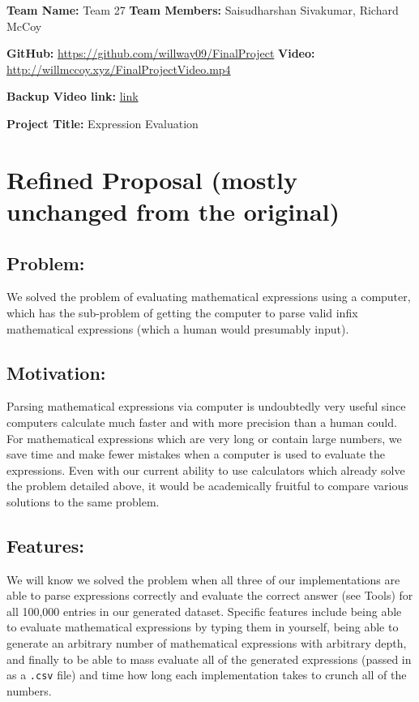 \documentclass[11pt]{article}
\begin{document}
\textbf{Team Name:} Team 27 \hspace*{1cm} \textbf{Team Members:} Saisudharshan Sivakumar, Richard McCoy

\textbf{GitHub:} \href{https://github.com/willway09/FinalProject}{https://github.com/willway09/FinalProject} \textbf{Video:} \href{http://willmccoy.xyz/FinalProjectVideo.mp4}{http://willmccoy.xyz/FinalProjectVideo.mp4}

\textbf{Backup Video link:} \href{https://github.com/willway09/FinalProject/blob/ea34b8ebe288f4970793b65e1c388a869160dbcc/FinalProjectVideo.mp4}{link}

\textbf{Project Title:} Expression Evaluation

\noindent\makebox[\linewidth]{\rule{19.1cm}{0.4pt}}

\section*{Refined Proposal \small{(mostly unchanged from the original)}}

\subsection*{Problem:}
We solved the problem of evaluating mathematical expressions using a computer, which has the sub-problem of getting the computer to parse valid infix mathematical expressions (which a human would presumably input).

\subsection*{Motivation:}
Parsing mathematical expressions via computer is undoubtedly very useful since computers calculate much faster and with more precision than a human could.
For mathematical expressions which are very long or contain large numbers, we save time and make fewer mistakes when a computer is used to evaluate the expressions.
Even with our current ability to use calculators which already solve the problem detailed above, it would be academically fruitful to compare various solutions to the same problem.

\subsection*{Features:}
We will know we solved the problem when all three of our implementations are able to parse expressions correctly and evaluate the correct answer (see Tools) for all 100,000 entries in our generated dataset.
Specific features include being able to evaluate mathematical expressions by typing them in yourself, being able to generate an arbitrary number of mathematical expressions with arbitrary depth, and finally to be able to mass evaluate all of the generated expressions (passed in as a \texttt{.csv} file) and time how long each implementation takes to crunch all of the numbers.
\end{document}
